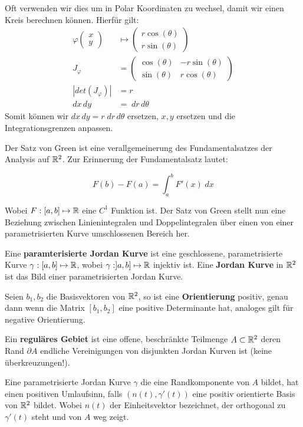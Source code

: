 Oft verwenden wir dies um in Polar Koordinaten zu wechsel, damit wir einen Kreis berechnen
können. Hierfür gilt:
\begin{align*}
  \varphi \begin{pmatrix}
    x\\
    y
  \end{pmatrix}
  &\mapsto
  \begin{pmatrix}
    r \cos(\theta)\\
    r \sin(\theta)
  \end{pmatrix}\\
  J_\varphi &=
  \begin{pmatrix}
    \cos(\theta) & -r \sin(\theta)\\
    \sin(\theta) & r \cos(\theta)
  \end{pmatrix}\\
  |det(J_\varphi)| &= r\\
  dx \, dy &= \; dr \, d\theta
\end{align*}
Somit können wir $dx\, dy = r \; dr \, d\theta$ ersetzen, $x,y$ ersetzen und die
Integrationsgrenzen anpassen.



Der Satz von Green ist eine verallgemeinerung des Fundamentalsatzes der Analysis auf $\mathbb{R}^2$. 
Zur Erinnerung der Fundamentalsatz lautet:

$$F(b) - F(a) = \int_a^b F'(x) \; dx$$

Wobei $F: [a,b] \mapsto \mathbb{R}$ eine $C^1$ Funktion ist. Der Satz von Green stellt nun eine Beziehung zwischen Linienintegralen und Doppelintegralen über einen von einer parametrisierten Kurve umschlossenen Bereich her. \medskip

Eine \textbf{paramterisierte Jordan Kurve} ist eine geschlossene, parametrisierte Kurve $\gamma: [a,b] \mapsto \mathbb{R}$, wobei 
$\gamma: ]a,b] \mapsto \mathbb{R}$ injektiv ist. Eine \textbf{Jordan Kurve} in $\mathbb{R}^2$ ist das Bild einer parametrisierten Jordan Kurve. \medskip

Seien $b_1, b_2$ die Basisvektoren von $\mathbb{R}^2$, so ist eine \textbf{Orientierung} positiv, genau dann wenn die Matrix $[b_1, b_2]$ 
eine positive Determinante hat, analoges gilt für negative Orientierung. \medskip

Ein \textbf{reguläres Gebiet} ist eine offene, beschränkte Teilmenge $A \subset \mathbb{R}^2$ deren Rand $\partial A$ endliche Vereinigungen 
von disjunkten Jordan Kurven ist (keine überkreuzungen!). \medskip

Eine parametrisierte Jordan Kurve $\gamma$ die eine Randkomponente von $A$ bildet, hat einen positiven Umlaufsinn, falls 
$(n(t), \gamma'(t))$ eine positiv orientierte Basis von $\mathbb{R}^2$ bildet. Wobei $n(t)$ der Einheitsvektor bezeichnet, der orthogonal zu
$\gamma '(t)$ steht und von $A$ weg zeigt. \medskip

